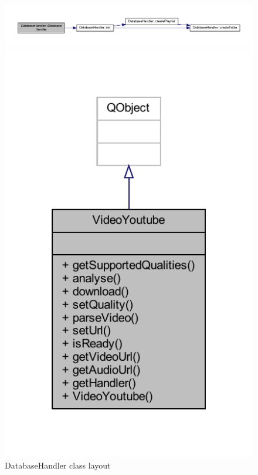 \documentclass{article}
\begin{document}
\begin{figure}
    \begin{sideways}
        \centering
        \includegraphics[width=\textheight]{classPdfs/classDatabaseHandler_a6f3d7ae8a73f534059dc5667b29eb0d2_cgraph.pdf} 
    \end{sideways}
    \includegraphics[]{classPdfs/classVideoYoutube.pdf}
    \caption{DatabaseHandler class layout} \label{fig:DatabaseHandler class layout}
\end{figure}
\end{document}
